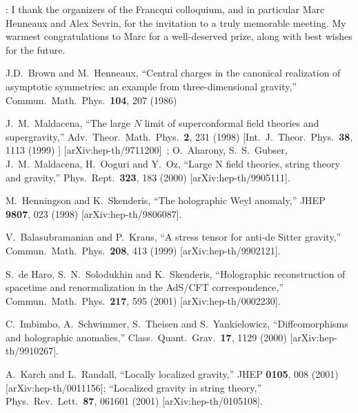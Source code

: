 \documentclass[a4paper,12pt,oneside]{article}
\begin{document}
\vspace{9mm}

:
I thank the organizers of the Francqui colloquium, and in
particular Marc Henneaux and Alex Sevrin, for the invitation
to a truly memorable  meeting. 
My warmest  congratulations  to Marc
for a well-deserved prize, along with  best wishes for the future.  

\vspace{5mm}


\begin{thebibliography}{99}

  J.D.~Brown and M.~Henneaux,
``Central charges in the canonical realization of asymptotic symmetries:
an example from three-dimensional gravity,''
Commun.\ Math.\ Phys.\  {\bf 104}, 207 (1986)

J.~M.~Maldacena,
``The large $N$ limit of superconformal field theories and supergravity,''
Adv.\ Theor.\ Math.\ Phys.\  {\bf 2},  231 (1998)
[Int.\ J.\ Theor.\ Phys.\  {\bf 38},  1113  (1999) ]
[arXiv:hep-th/9711200]~; 
O.~Aharony, S.~S.~Gubser, J.~M.~Maldacena, H.~Ooguri and Y.~Oz,
``Large N field theories, string theory and gravity,''
Phys.\ Rept.\  {\bf 323}, 183 (2000)
[arXiv:hep-th/9905111].

M.~Henningson and K.~Skenderis,
``The holographic Weyl anomaly,''
JHEP {\bf 9807}, 023 (1998)
[arXiv:hep-th/9806087].


  V.~Balasubramanian and P.~Kraus,
``A stress tensor for anti-de Sitter gravity,''
Commun.\ Math.\ Phys.\  {\bf 208}, 413 (1999)
[arXiv:hep-th/9902121].

S.~de Haro, S.~N.~Solodukhin and K.~Skenderis,
``Holographic reconstruction of spacetime and
 renormalization in the  AdS/CFT correspondence,''
Commun.\ Math.\ Phys.\  {\bf 217}, 595 (2001)
[arXiv:hep-th/0002230].

C.~Imbimbo, A.~Schwimmer, S.~Theisen and S.~Yankielowicz,
``Diffeomorphisms and holographic anomalies,''
Class.\ Quant.\ Grav.\  {\bf 17}, 1129 (2000)
[arXiv:hep-th/9910267].


A.~Karch and L.~Randall,
``Locally localized gravity,''
JHEP {\bf 0105}, 008 (2001)
[arXiv:hep-th/0011156];
``Localized gravity in string theory,''
Phys.\ Rev.\ Lett.\  {\bf 87}, 061601 (2001)
[arXiv:hep-th/0105108].


\end{thebibliography}
\end{document}
